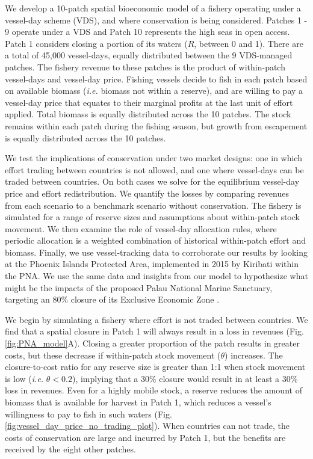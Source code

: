 \documentclass[12pt]{article}
\begin{document}
We develop a 10-patch spatial bioeconomic model of a fishery operating under a vessel-day scheme (VDS), and where conservation is being considered. Patches 1 - 9 operate under a VDS and Patch 10 represents the high seas in open access. Patch 1 considers closing a portion of its waters ($R$, between 0 and 1). There are a total of 45,000 vessel-days, equally distributed between the 9 VDS-managed patches. The fishery revenue to these patches is the product of within-patch vessel-days and vessel-day price. Fishing vessels decide to fish in each patch based on available biomass (\emph{i.e.} biomass not within a reserve), and are willing to pay a vessel-day price that equates to their marginal profits at the last unit of effort applied. Total biomass is equally distributed across the 10 patches. The stock remains within each patch during the fishing season, but growth from escapement is equally distributed across the 10 patches.

We test the implications of conservation under two market designs: one in which effort trading between countries is not allowed, and one where vessel-days can be traded between countries. On both cases we solve for the equilibrium vessel-day price and effort redistribution. We quantify the losses by comparing revenues from each scenario to a benchmark scenario without conservation. The fishery is simulated for a range of reserve sizes and assumptions about within-patch stock movement. We then examine the role of vessel-day allocation rules, where periodic allocation is a weighted combination of historical within-patch effort and biomass. Finally, we use vessel-tracking data to corroborate our results by looking at the Phoenix Islands Protected Area, implemented in 2015 by Kiribati within the PNA. We use the same data and insights from our model to hypothesize what might be the impacts of the proposed Palau National Marine Sanctuary, targeting an 80\% closure of its Exclusive Economic Zone \cite{cimino_2019}.

We begin by simulating a fishery where effort is not traded between countries. We find that a spatial closure in Patch 1 will always result in a loss in revenues (Fig. \ref{fig:PNA_model}A). Closing a greater proportion of the patch results in greater costs, but these decrease if within-patch stock movement ($\theta$) increases. The closure-to-cost ratio for any reserve size is greater than 1:1 when stock movement is low (\emph{i.e.} $\theta < 0.2$), implying that a 30\% closure would result in at least a 30\% loss in revenues. Even for a highly mobile stock, a reserve reduces the amount of biomass that is available for harvest in Patch 1, which reduces a vessel's willingness to pay to fish in such waters (Fig. \ref{fig:vessel_day_price_no_trading_plot}). When countries can not trade, the costs of conservation are large and incurred by Patch 1, but the benefits are received by the eight other patches.
\end{document}
